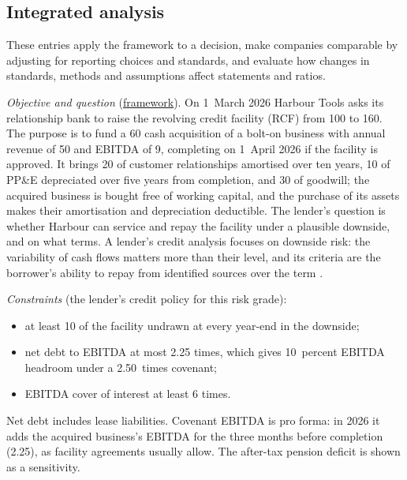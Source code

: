 \subsection{Integrated analysis}

These entries apply the framework to a decision, make companies comparable by adjusting for reporting choices and standards, and evaluate how changes in standards, methods and assumptions affect statements and ratios.

\begin{qfexample}\label{ex:integrated-credit-decision}
 \emph{Objective and question} (\hyperref[def:statement-analysis-framework]{framework}). On 1~March 2026 Harbour Tools asks its relationship bank to raise the revolving credit facility (RCF) from 100 to 160. The purpose is to fund a 60 cash acquisition of a bolt-on business with annual revenue of 50 and EBITDA of 9, completing on 1~April 2026 if the facility is approved. It brings 20 of customer relationships amortised over ten years, 10 of PP\&E depreciated over five years from completion, and 30 of goodwill; the acquired business is bought free of working capital, and the purchase of its assets makes their amortisation and depreciation deductible. The lender's question is whether Harbour can service and repay the facility under a plausible downside, and on what terms. A lender's credit analysis focuses on downside risk: the variability of cash flows matters more than their level, and its criteria are the borrower's ability to repay from identified sources over the term \citep[pp.~8--9 and~636--637]{financial-statement-analysis-2009}.

\emph{Constraints} (the lender's credit policy for this risk grade):
\begin{itemize}
\item at least 10 of the facility undrawn at every year-end in the downside;
\item net debt to EBITDA at most 2.25 times, which gives 10~percent EBITDA headroom under a 2.50~times covenant;
\item EBITDA cover of interest at least 6 times.
\end{itemize}
Net debt includes lease liabilities. Covenant EBITDA is pro forma: in 2026 it adds the acquired business's EBITDA for the three months before completion (2.25), as facility agreements usually allow. The after-tax pension deficit is shown as a sensitivity.


\end{qfexample}
